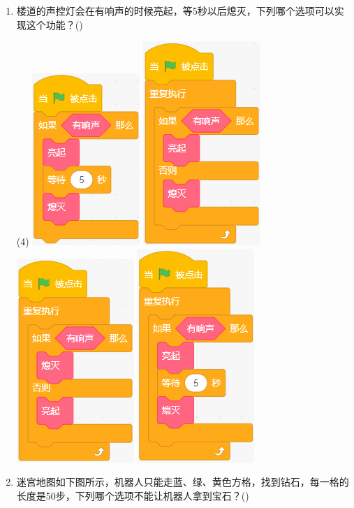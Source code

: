 \documentclass[10pt, a4paper]{article}
\newcommand{\hq}{\hfill(\qquad)}
\begin{document}
\begin{enumerate}
        \item 楼道的声控灯会在有响声的时候亮起，等5秒以后熄灭，下列哪个选项可以实现这个功能？\hq
        \begin{tasks}(4)
            \task \includegraphics[width=.11\textwidth]{figure/19a.png}
            \task \includegraphics[width=.1\textwidth]{figure/19b.png}
            \task \includegraphics[width=.1\textwidth]{figure/19c.png}
            \task \includegraphics[width=.1\textwidth]{figure/19d.png}
        \end{tasks}

        \item 迷宫地图如下图所示，机器人只能走蓝、绿、黄色方格，找到钻石，每一格的长度是50步，下列哪个选项不能让机器人拿到宝石？\hq
        

\end{enumerate}
\end{document}
